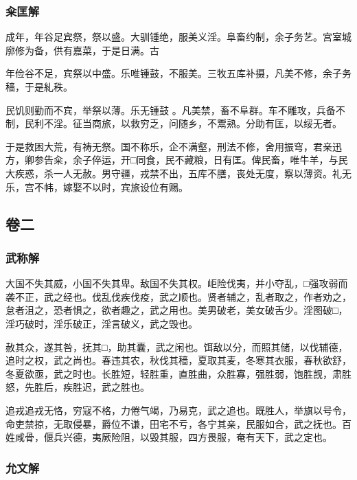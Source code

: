 \documentclass[]{article}
\begin{document}
\hypertarget{header-n49}{%
\subsubsection{籴匡解}\label{header-n49}}

成年，年谷足宾祭，祭以盛。大驯锺绝，服美义淫。阜畜约制，余子务艺。宫室城廓修为备，供有嘉菜，于是日满。古

年俭谷不足，宾祭以中盛。乐唯锺鼓，不服美。三牧五库补摄，凡美不修，余子务穑，于是糺秩。

民饥则勤而不宾，举祭以薄。乐无锺鼓
。凡美禁，畜不阜群。车不雕攻，兵备不制，民利不淫。征当商旅，以救穷乏，问随乡，不鬻熟。分助有匡，以绥无者。

于是救困大荒，有祷无祭。国不称乐，企不满壑，刑法不修，舍用振穹，君亲迅方，卿参告籴，余子倅运，开□同食，民不藏粮，日有匡。俾民畜，唯牛羊，与民大疾惑，杀一人无赦。男守疆，戎禁不出，五库不膳，丧处无度，察以薄资。礼无乐，宫不帏，嫁娶不以时，宾旅设位有赐。

\hypertarget{header-n56}{%
\subsection{卷二}\label{header-n56}}

\hypertarget{header-n57}{%
\subsubsection{武称解}\label{header-n57}}

大国不失其威，小国不失其卑。敌国不失其权。岠险伐夷，并小夺乱，□强攻弱而袭不正，武之经也。伐乱伐疾伐疫，武之顺也。贤者辅之，乱者取之，作者劝之，怠者沮之，恐者惧之，欲者趣之，武之用也。美男破老，美女破舌少。淫图破□，淫巧破时，淫乐破正，淫言破义，武之毁也。

赦其众，遂其咎，抚其□，助其囊，武之闲也。饵敌以分，而照其储，以伐辅德，追时之权，武之尚也。春违其农，秋伐其穑，夏取其麦，冬寒其衣服，春秋欲舒，冬夏欲亟，武之时也。长胜短，轻胜重，直胜曲，众胜寡，强胜弱，饱胜觊，肃胜怒，先胜后，疾胜迟，武之胜也。

追戎追戎无恪，穷寇不格，力倦气竭，乃易克，武之追也。既胜人，举旗以号令，命吏禁掠，无取侵暴，爵位不谦，田宅不亏，各宁其亲，民服如合，武之抚也。百姓咸骨，偃兵兴德，夷厥险阻，以毁其服，四方畏服，奄有天下，武之定也。

\hypertarget{header-n63}{%
\subsubsection{允文解}\label{header-n63}}
\end{document}
